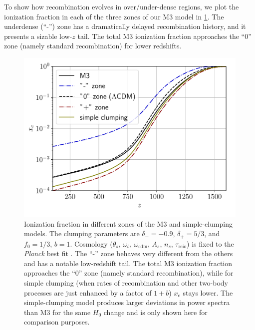 To show how recombination evolves in over/under-dense regions, we plot the ionization fraction in each of the three zones of our M3 model in \cref{fig:M3demo-rec-details}.
The underdense (``-'') zone has a dramatically delayed recombination history, and it presents a sizable low-$z$ tail.
The total M3 ionization fraction approaches the ``0'' zone (namely standard recombination) for lower redshifts.

\begin{figure}[ht!]
\includegraphics[width=\columnwidth]{img/M3demo-rec-details.pdf}
\caption[Ionization fraction in different clumping models]{Ionization fraction in different zones of the M3 and simple-clumping models.
The clumping parameters are $\delta_-=-0.9$, $\delta_+=5/3$, and $f_0=1/3$, $b=1$.
Cosmology ($\theta_s$, $\omega_b$, $\omega_\mathrm{cdm}$, $A_s$, $n_s$, $\tau_\mathrm{reio}$) is fixed to the {\it Planck} best fit \citep{Planck2018-cosmo}.
The ``-'' zone behaves very different from the others and has a notable low-redshift tail.
The total M3 ionization fraction approaches the ``0'' zone (namely standard recombination), while for simple clumping (when rates of recombination and other two-body processes are just enhanced by a factor of $1+b$) $x_e$ stays lower.
The simple-clumping model produces larger deviations in power spectra than M3 for the same $H_0$ change and is only shown here for comparison purposes.}
\label{fig:M3demo-rec-details}
\end{figure}

